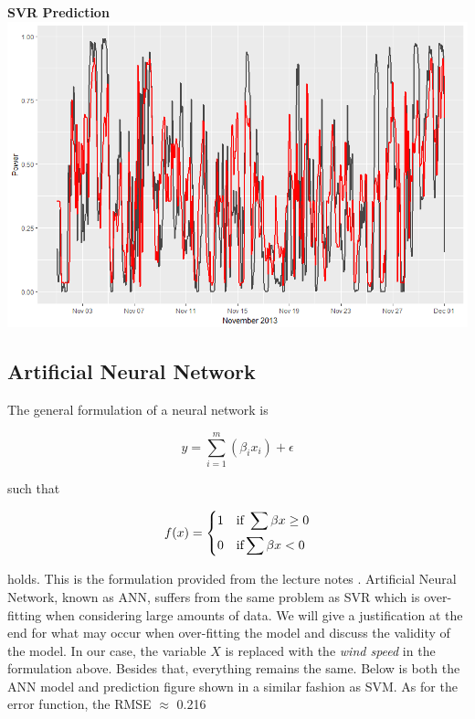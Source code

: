 \documentclass[
11pt, %
english, %
singlespacing, %
parskip, %
headsepline, %
]{report} %
\begin{document}
    \begin{center}
        \textbf{SVR Prediction}\\
    	\includegraphics[scale=0.3, width=\textwidth]{figures/Rplot_SVR.png}\\[1cm]    
    \end{center}

\newpage

\subsection{Artificial Neural Network}

    The general formulation of a neural network is
    
	\begin{equation}
	    y = \sum_{i = 1}^{m}(\beta_{i}x_{i}) + \epsilon
	\end{equation}
	
	such that
	
	\begin{center}
	    \[
            f(x)= 
	        \begin{dcases}
                1 & \text{if } \sum \beta x \geq 0\\
                0 & \text{if} \sum \beta x < 0
            \end{dcases}
        \]
    \end{center}
    
    holds. This is the formulation provided from the lecture notes \cite{neuralnetForm}. Artificial Neural Network, known as ANN, suffers from the same problem as SVR which is over-fitting when considering large amounts of data. We will give a justification at the end for what may occur when over-fitting the model and discuss the validity of the model. In our case, the variable $X$ is replaced with the \emph{wind speed} in the formulation above. Besides that, everything remains the same. Below is both the ANN model and prediction figure shown in a similar fashion as SVM. As for the error function, the RMSE $\approx$ 0.216
	
\end{document}
